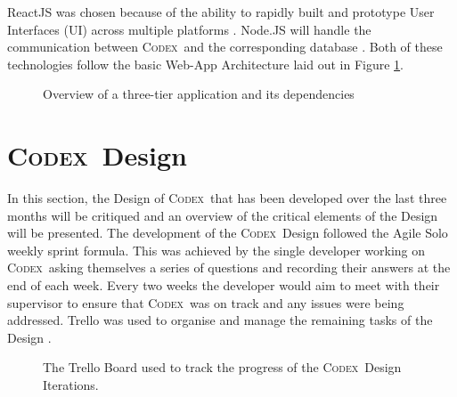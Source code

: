 \documentclass[progress]{cmpreport}
\newcommand{\Codex}{\textsc{Codex}}
\begin{document}
	ReactJS was chosen because of the ability to rapidly built and prototype User Interfaces (UI) across multiple platforms \citep{ReactJSOfficial}. Node.JS will handle the communication between \Codex \ and the corresponding database \citep{NodejsOfficial}. Both of these technologies follow the basic Web-App Architecture laid out in Figure \ref{Web-App-Arch}.
	\begin{figure}
		\centering
		\caption{Overview of a three-tier application and its dependencies \citep{SecurityWebApps}} \label{Web-App-Arch}
	\end{figure}
	
	\section{\Codex \ Design}
	In this section, the Design of \Codex \ that has been developed over the last three months will be critiqued and an overview of the critical elements of the Design will be presented. The development of the \Codex \ Design followed the Agile Solo weekly sprint formula. This was achieved by the single developer working on \Codex \ asking themselves a series of questions and recording their answers at the end of each week. Every two weeks the developer would aim to meet with their supervisor to ensure that \Codex \ was on track and any issues were being addressed. Trello was used to organise and manage the remaining tasks of the Design \citep{trello}.
	
	\begin{figure}[h]
		\centering
		\caption{The Trello Board used to track the progress of the \Codex \ Design Iterations.} \label{fig:trello-board}
	\end{figure}
	
\end{document}
